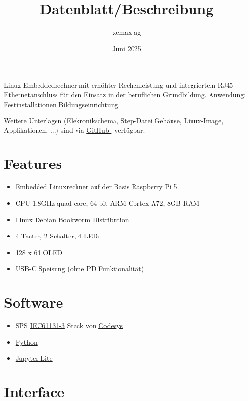 \documentclass[10pt]{datasheet}
\title{Datenblatt/Beschreibung \xlhPlattformID}
\author{xemax ag}
\date{Juni 2025}
\begin{document}
\maketitle



Linux Embeddedrechner mit erhöhter Rechenleistung und integriertem RJ45 Ethernetanschluss für den Einsatz in der beruflichen Grundbildung.
Anwendung: Festinstallationen Bildungseinrichtung.

Weitere Unterlagen (Elekronikschema, Step-Datei Gehäuse, Linux-Image, Applikationen, ...) sind via
\href{https://github.com/xemax-ag/xLH/}{GitHub \xlhPlattformID}\ verfügbar.

\section{Features}

\begin{itemize}
    \item Embedded Linuxrechner auf der Basis Raspberry Pi 5
    \item CPU 1.8GHz quad-core, 64-bit ARM Cortex-A72, 8GB RAM
    \item Linux Debian Bookworm Distribution
    \item 4 Taster, 2 Schalter, 4 LEDs
    \item 128 x 64 OLED
    \item USB-C Speisung (ohne PD Funktionalität)
\end{itemize}

\section{Software}

\begin{itemize}
    \item SPS \href{https://de.wikipedia.org/wiki/EN_61131}{IEC61131-3} Stack von \href{https://www.codesys.com/}{Codesys}
    \item \href{https://www.python.org/}{Python}
    \item \href{https://jupyter.org/try-jupyter/lab/}{Jupyter Lite}
\end{itemize}

\section{Interface}
\end{document}
